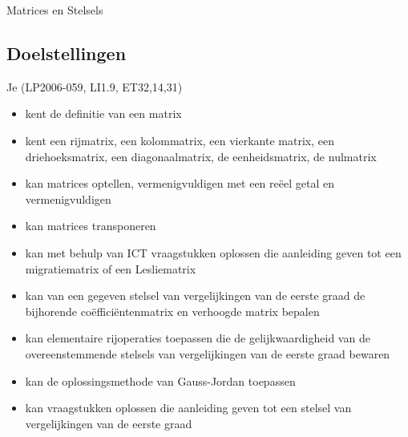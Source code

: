 \documentclass[12pt,twoside]{article}
\begin{document}
\pagestyle{fancy}
\lhead{}

\begin{theorie}

  \thispagestyle{empty}
  \begin{center}
    \begin{mdframed}
      \centering
      \fontsize{40}{60}\selectfont Matrices en Stelsels
    \end{mdframed}
    \vfill
    \vfill
  \end{center}

  \subsection*{Doelstellingen}
  \vspace*{-0.8cm}
  {\singlespacing
    Je \hfill  {\scriptsize(LP2006-059, LI1.9, ET32,14,31)}
    \begin{itemize}
    \itemsep-0.2em
    \item kent de definitie van een matrix
    \item kent een rijmatrix, een kolommatrix, een vierkante matrix, een driehoeksmatrix, een diagonaalmatrix, de eenheidsmatrix, de nulmatrix
    \item kan matrices optellen, vermenigvuldigen met een reëel getal en vermenigvuldigen
    \item kan matrices transponeren
    \item kan met behulp van ICT vraagstukken oplossen die aanleiding geven tot een migratiematrix of een Lesliematrix
    \item kan van een gegeven stelsel van vergelijkingen van de eerste graad de bijhorende coëfficiëntenmatrix en verhoogde matrix bepalen
    \item kan elementaire rijoperaties toepassen die de gelijkwaardigheid van de overeenstemmende stelsels van vergelijkingen van de eerste graad bewaren
    \item kan de oplossingsmethode van Gauss-Jordan toepassen
    \item kan vraagstukken oplossen die aanleiding geven tot een stelsel van vergelijkingen van de eerste graad
    \end{itemize}}

  \thispagestyle{empty}
  \mbox{}
  \newpage
  \clearpage
  \thispagestyle{empty}
  \tableofcontents
  \newpage
  \clearpage

  \fancyhead[RE,LO]{}

\end{theorie}
\end{document}
